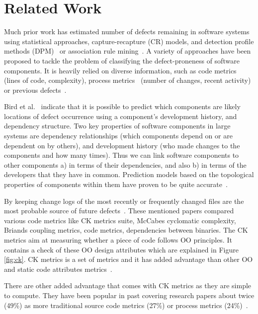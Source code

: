 \documentclass[sigconf,review, anonymous]{acmart}
\theoremstyle{break}
\theoremstyle{break}
\begin{document}
\section{Related Work}
\label{sect:review}

Much prior work has estimated number of defects remaining in software systems~\cite{hall2012systematic} using statistical approaches, capture-recapture 
(CR) models, and detection profile methods (DPM)~\cite{song2011general} or
association rule mining~\cite{song2006software}. A variety of approaches have been proposed to tackle the problem of classifying the defect-proneness of software components. It is heavily relied on diverse information, such as code metrics~\cite{d2010extensive,menzies2007data, nagappan2006mining,shepperd2014researcher,Menzies2010} (lines of code, complexity), process metrics~\cite{hassan2009predicting} (number of changes, recent activity) or previous defects~\cite{kim2007predicting}.

Bird et al.~\cite{bird2009putting} indicate that it is possible to predict which components are likely locations of
defect occurrence using a component's development history,
and dependency structure. Two key properties of software components
in large systems are dependency relationships (which components
depend on or are dependent on by others), and development
history (who made changes to the components and
how many times). Thus we can link software components
to other components a) in terms of their dependencies, and
also b) in terms of the developers that they have in common. Prediction models based on the topological properties
of components within them have proven to be quite
accurate~\cite{zimmermann2008predicting}.

By keeping change logs of the most recently or frequently changed files are the most probable source of future defects~\cite{hall2012systematic, catal2009systematic}. These mentioned papers compared various code metrics like CK  metrics  suite,  
McCabes  cyclomatic  complexity, Briands coupling metrics, code metrics, 
dependencies between  binaries. The CK metrics aim at measuring whether a 
piece of code follows OO principles. It contains a check of these OO design 
attributes which are explained in Figure \ref{fig:ck}. CK metrics is a set
of metrics and it has added advantage than other OO and static code attributes metrics~\cite{d2010extensive}. 

There are other added advantage that comes with CK metrics as they are  simple  to  compute. They have been popular in past covering research papers about twice (49\%) 
as more traditional source code metrics (27\%) or process metrics (24\%)~\cite{radjenovic2013software}. 
\end{document}
